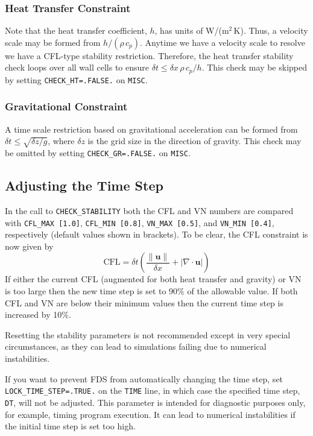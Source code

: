 \documentclass[11pt]{book}
\newcommand{\ct}{\tt\small}
\newcommand{\dz}{\delta z}
\begin{document}
\subsubsection{Heat Transfer Constraint}

Note that the heat transfer coefficient, $h$, has units of W/(m$^2$\,K).  Thus, a velocity scale may be formed from $h/(\rho\, c_p)$.
Anytime we have a velocity scale to resolve we have a CFL-type stability restriction.
Therefore, the heat transfer stability check loops over all wall cells to ensure $\delta t \le \delta x \,\rho \,c_p/h$.
This check may be skipped by setting {\ct CHECK\_HT=.FALSE.} on {\ct MISC}.

\subsubsection{Gravitational Constraint}

A time scale restriction based on gravitational acceleration can be formed from $\delta t \le \sqrt{\delta z/g}$, where $\dz$ is the grid size in the
direction of gravity.
This check may be omitted by setting  {\ct CHECK\_GR=.FALSE.} on {\ct MISC}.

\subsection{Adjusting the Time Step}

In the call to {\ct CHECK\_STABILITY} both the CFL and VN numbers are compared with {\ct CFL\_MAX [1.0]}, {\ct CFL\_MIN [0.8]}, {\ct VN\_MAX [0.5]},
and {\ct VN\_MIN [0.4]}, respectively (default values shown in brackets).  To be clear, the CFL constraint is now given by
\begin{equation}
\mbox{CFL} = \delta t \left( \frac{\|\mathbf{u}\|}{\delta x} + |\nabla\cdot\mathbf{u}| \right)
\end{equation}
If either the current CFL (augmented for both heat transfer and gravity) or VN is too large then the new time step is set to 90\% of the allowable value.
If both CFL and VN are below their minimum values then the current time step is increased by 10\%.

\begin{warning}
Resetting the stability parameters is not recommended except in very special circumstances, as they can lead to
simulations failing due to numerical instabilities.
\end{warning}

\noindent
If you want to prevent FDS from automatically changing the time step, set {\ct LOCK\_TIME\_STEP=.TRUE.}
on the {\ct TIME} line, in which case the specified
time step, {\ct DT}, will not be adjusted.
This parameter is intended for diagnostic purposes only, for example, timing program execution. It can lead to
numerical instabilities if the initial time step is set too high.
\end{document}
